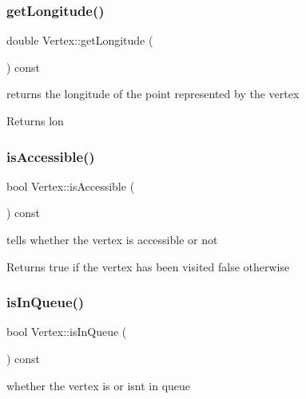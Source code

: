 \subsubsection{\texorpdfstring{get\+Longitude()}{getLongitude()}}
{\footnotesize\ttfamily double Vertex\+::get\+Longitude (\begin{DoxyParamCaption}{ }\end{DoxyParamCaption}) const}



returns the longitude of the point represented by the vertex 

\begin{DoxyReturn}{Returns}
lon 
\end{DoxyReturn}
\hypertarget{class_vertex_ac6febe9ce4ec00dcd59710e1b0fba407}{}\label{class_vertex_ac6febe9ce4ec00dcd59710e1b0fba407} 
\subsubsection{\texorpdfstring{is\+Accessible()}{isAccessible()}}
{\footnotesize\ttfamily bool Vertex\+::is\+Accessible (\begin{DoxyParamCaption}{ }\end{DoxyParamCaption}) const}



tells whether the vertex is accessible or not 

\begin{DoxyReturn}{Returns}
true if the vertex has been visited false otherwise 
\end{DoxyReturn}
\hypertarget{class_vertex_aac8bd382faf2f37c38583c0ec1a3801e}{}\label{class_vertex_aac8bd382faf2f37c38583c0ec1a3801e} 
\subsubsection{\texorpdfstring{is\+In\+Queue()}{isInQueue()}}
{\footnotesize\ttfamily bool Vertex\+::is\+In\+Queue (\begin{DoxyParamCaption}{ }\end{DoxyParamCaption}) const\hspace{0.3cm}{\ttfamily [inline]}}



whether the vertex is or isn\textquotesingle{}t in queue 

